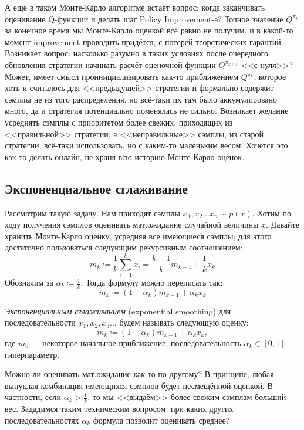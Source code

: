 А ещё в таком Монте-Карло алгоритме встаёт вопрос: когда заканчивать оценивание Q-функции и делать шаг Policy Improvement-а? Точное значение $Q^{\pi_k}$ за конечное время мы Монте-Карло оценкой всё равно не получим, и в какой-то момент improvement проводить придётся, с потерей теоретических гарантий. Возникает вопрос: насколько разумно в таких условиях после очередного обновления стратегии начинать расчёт оценочной функции $Q^{\pi_{k+1}}$ <<с нуля>>? Может, имеет смысл проинициализировать как-то приближением $Q^{\pi_k}$, которое хоть и считалось для <<предыдущей>> стратегии и формально содержит сэмплы не из того распределения, но всё-таки их там было аккумулировано много, да и стратегия потенциально поменялась не сильно. Возникает желание усреднять сэмплы с приоритетом более свежих, приходящих из <<правильной>> стратегии; а <<неправильные>> сэмплы, из старой стратегии, всё-таки использовать, но с каким-то маленьким весом. Хочется это как-то делать онлайн, не храня всю историю Монте-Карло оценок.

\subsection{Экспоненциальное сглаживание}

Рассмотрим такую задачу. Нам приходят сэмплы $x_1, x_2 \dots x_n \sim p(x)$. Хотим по ходу получения сэмплов оценивать мат.ожидание случайной величины $x$. Давайте хранить Монте-Карло оценку, усредняя все имеющиеся сэмплы; для этого достаточно пользоваться следующим рекурсивным соотношением:
$$m_{k} \coloneqq \frac{1}{k} \sum_{i=1}^{k} x_i = \frac{k - 1}{k}m_{k-1} + \frac{1}{k}x_{k}$$
Обозначим за $\alpha_k \coloneqq \frac{1}{k}$. Тогда формулу можно переписать так:
$$m_{k} \coloneqq (1 - \alpha_k)m_{k-1} + \alpha_k x_{k}$$

\begin{definition}
\emph{Экспоненциальным сглаживанием} (exponential smoothing) для последовательности $x_1, x_2, x_3 \dots$ будем называть следующую оценку:
$$m_{k} \coloneqq (1 - \alpha_k) m_{k - 1} + \alpha_k x_k,$$
где $m_0$ --- некоторое начальное приближение, последовательность $\alpha_k \in [0, 1]$ --- гиперпараметр. 
\end{definition}

Можно ли оценивать мат.ожидание как-то по-другому? В принципе, любая выпуклая комбинация имеющихся сэмплов будет несмещённой оценкой. В частности, если $\alpha_k > \frac{1}{k}$, то мы <<выдаём>> более свежим сэмплам больший вес. Зададимся таким техническим вопросом: при каких других последовательностях $\alpha_k$ формула позволит оценивать среднее?

